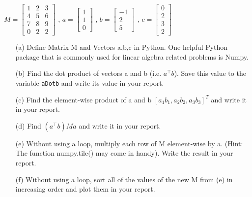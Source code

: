 	$M = \left[
		\begin{matrix}
		1 & 2 & 3 \\
		4 & 5 & 6 \\
		7 & 8 & 9 \\
		0 & 2 & 2
		\end{matrix} \right]$
  ,
	$a = \left[
		\begin{matrix}
		1 \\ 1 \\ 0
		\end{matrix} \right]
	$
  ,
	$b = \left[
		\begin{matrix}
		-1 \\ 2 \\ 5
		\end{matrix} \right]
  $
  , 
	$c = \left[
		\begin{matrix}
		0 \\ 2 \\ 3 \\ 2
		\end{matrix} \right]
	$

\begin{itemize}
	\item[(a)]
	Define Matrix M and Vectors a,b,c in Python. One helpful Python package that is commonly used for linear
    algebra related problems is Numpy.
	\item[(b)]
	Find the dot product of vectors a and b (i.e. $a^{\top} b$).
  Save this value to the variable \texttt{aDotb} and write its value in your report.
	\item[(c)]
	Find the element-wise product of a and b $\left[a_1 b_1, a_2 b_2, a_3 b_3 \right]^T$ and write it in your report.
	\item[(d)]
	Find $(a^{\top} b) M a$ and write it in your report.
	\item[(e)]
	Without using a loop, multiply each row of M element-wise by a.
  (Hint: The function numpy.tile() may come in handy). Write the result in your report.
	\item[(f)]
	Without using a loop, sort all of the values of the new M from (e) in increasing order
	and plot them in your report.
\end{itemize}

